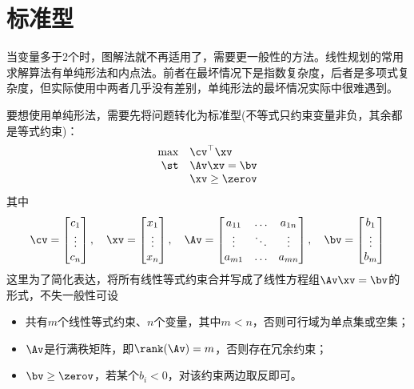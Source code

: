 \documentclass{ctexart}
\begin{document}
\section{标准型}

当变量多于$2$个时，图解法就不再适用了，需要更一般性的方法。线性规划的常用求解算法有单纯形法和内点法。前者在最坏情况下是指数复杂度，后者是多项式复杂度，但实际使用中两者几乎没有差别，单纯形法的最坏情况实际中很难遇到。

要想使用单纯形法，需要先将问题转化为标准型(不等式只约束变量非负，其余都是等式约束)：
\begin{align*}
    \begin{array}{rl}
        \max & \cv^\top \xv   \\
        \st  & \Av \xv = \bv  \\
             & \xv \ge \zerov
    \end{array}
\end{align*}
其中
\begin{align*}
    \cv = \begin{bmatrix}
              c_1 \\ \vdots \\ c_n
          \end{bmatrix}, \quad
    \xv = \begin{bmatrix}
              x_1 \\ \vdots \\ x_n
          \end{bmatrix}, \quad
    \Av= \begin{bmatrix}
             a_{11} & \ldots & a_{1n} \\
             \vdots & \ddots & \vdots \\
             a_{m1} & \ldots & a_{mn}
         \end{bmatrix}, \quad
    \bv = \begin{bmatrix}
              b_1 \\ \vdots \\ b_m
          \end{bmatrix}
\end{align*}
这里为了简化表达，将所有线性等式约束合并写成了线性方程组$\Av \xv = \bv$的形式，不失一般性可设
\begin{itemize}
    \item 共有$m$个线性等式约束、$n$个变量，其中$m < n$，否则可行域为单点集或空集；
    \item $\Av$是行满秩矩阵，即$\rank(\Av) = m$，否则存在冗余约束；
    \item $\bv \ge \zerov$，若某个$b_i < 0$，对该约束两边取反即可。
\end{itemize}
\end{document}
